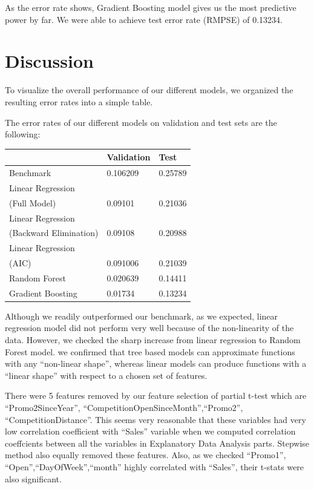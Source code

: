 \documentclass[letterpaper,twocolumn,11pt]{article}
\begin{document}
As the error rate shows, Gradient Boosting model gives us the most predictive power by far. We were able to achieve test error rate (RMPSE) of 0.13234.


\section{Discussion}
To visualize the overall performance of our different models, we organized the resulting error rates into a simple table. 

The error rates of our different models on validation and test sets are the following:

\begin{center}
    \begin{tabular}{| l | l | l |}
      \hline
       & Validation & Test \\ \hline
      Benchmark & 0.106209 & 0.25789  \\ \hline
      Linear Regression \\
      (Full Model) & 0.09101 & 0.21036 \\ \hline
      Linear Regression \\
      (Backward Elimination) & 0.09108 & 0.20988 \\ \hline
      Linear Regression \\
      (AIC) & 0.091006 & 0.21039 \\ \hline
      Random Forest & 0.020639 & 0.14411  \\ \hline
      Gradient Boosting & 0.01734 & 0.13234  \\ \hline
      \hline    
    \end{tabular}
\end{center}

    Although we readily outperformed our benchmark, as we expected, linear regression model did not perform very well because of the non-linearity of the data. However, we checked the sharp increase from linear regression to Random Forest model. we confirmed that tree based models can approximate functions with any ``non-linear shape'', whereas linear models can produce functions with a ``linear shape'' with respect to a chosen set of features. 

    There were 5 features removed by our feature selection of partial t-test which are ``Promo2SinceYear'', ``CompetitionOpenSinceMonth'',``Promo2'', ``CompetitionDistance''. This seems very reasonable that these variables had very low correlation coefficient with ``Sales'' variable when we computed correlation coeffcients between all the variables in Explanatory Data Analysis parts. Stepwise method also equally removed these features. Also, as we checked ``Promo1'', ``Open'',``DayOfWeek'',``month'' highly correlated with ``Sales'', their t-stats were also significant. 
\end{document}
